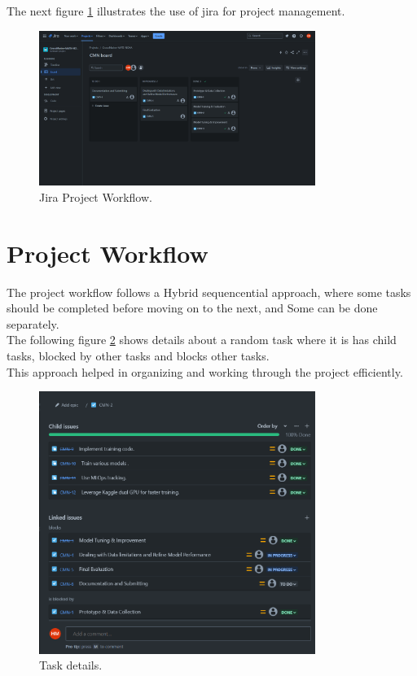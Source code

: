\documentclass{article}
\begin{document}
The next figure \ref{fig:jira_photo} illustrates the use of jira for project management.

\begin{figure}[htbp]
    \centering
    \includegraphics[width=0.8\textwidth]{jira.png}
    \caption{Jira Project Workflow.}
    \label{fig:jira_photo}
\end{figure}

\section{Project Workflow}

    The project workflow follows a Hybrid sequencential approach, where some tasks should be completed before moving on to the next, and Some can be done separately.\\
    The following figure \ref{fig:task_details} shows details about a random task where it is has child tasks, blocked by other tasks and blocks other tasks. \\
    This approach helped in organizing and working through the project efficiently.\\
    
    \begin{figure}[htb]
        \centering
        \includegraphics[width=0.8\textwidth]{process_image.png}
        \caption{Task details.}
        \label{fig:task_details}
    \end{figure}
\end{document}
